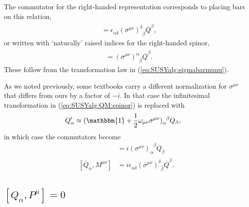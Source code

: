 \documentclass[12pt, oneside]{report}    %
\begin{document}
The commutator for the right-handed representation corresponds to placing bars on this relation,
\begin{align}
    [\overline Q_{\dot\alpha},M^{\mu\nu}] &= \epsilon_{\dot\alpha\dot\delta}(\overline\sigma^{\mu\nu})^{\dot\delta}_{\phantom\delta\dot\beta}\overline Q^{\dot\beta},\label{eq:SUSYalg:QbarM}
\end{align}
or written with `naturally' raised indices for the right-handed spinor,
\begin{align}
    [\overline Q^{\dot\alpha},M^{\mu\nu}] &= (\overline\sigma^{\mu\nu})^{\dot\alpha}_{\phantom\alpha\dot\beta}\overline Q^{\dot\beta}.\label{eq:SUSYalg:QbarMraised}
\end{align}
These follow from the transformation law in  (\ref{eq:SUSYalg:sigmabarmunu}).
%
\begin{example}
As we noted previously, some textbooks carry a different normalization for $\sigma^{\mu\nu}$ that differs from ours by a factor of $-i$. In that case the infinitesimal transformation in  (\ref{eq:SUSYalg:QM:spinor}) is replaced with
\begin{align}
    Q'_\alpha & \approx (\mathbbm{1}+\frac 12\omega_{\mu\nu}\sigma^{\mu\nu})_\alpha^{\phantom\alpha\beta}Q_\beta,
\end{align}
in which case the commutators become
\begin{align}
[Q_\alpha,M^{\mu\nu}] &= i(\sigma^{\mu\nu})_\alpha^{\phantom\alpha\beta}Q_\beta\\
    [\overline Q_{\dot\alpha},M^{\mu\nu}] &= i\epsilon_{\dot\alpha\dot\delta}(\overline\sigma^{\mu\nu})^{\dot\delta}_{\phantom\delta\dot\beta}\overline Q^{\dot\beta}.
    \end{align}
\end{example}



\subsection{\texorpdfstring{$[Q_\alpha,P^\mu]=0$}{[Q,P]}}
\end{document}
